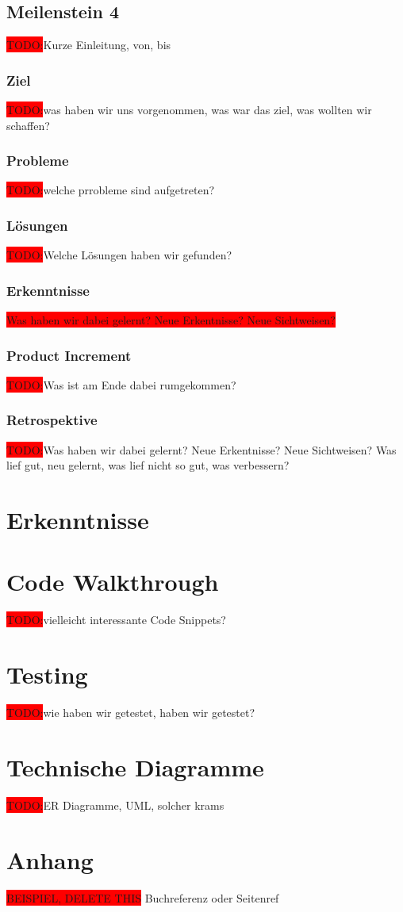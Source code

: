 \documentclass[10pt, a4paper, draft]{article}
\begin{document}
\subsection{Meilenstein 4}
\colorbox{red}{TODO:}Kurze Einleitung, von, bis
\subsubsection{Ziel}
\colorbox{red}{TODO:}was haben wir uns vorgenommen, was war das ziel, was wollten wir schaffen?
\subsubsection{Probleme}
\colorbox{red}{TODO:}welche prrobleme sind aufgetreten?

\subsubsection{Lösungen}
\colorbox{red}{TODO:}Welche Lösungen haben wir gefunden?

\subsubsection{Erkenntnisse}
\colorbox{red}{Was haben wir dabei gelernt? Neue Erkentnisse? Neue Sichtweisen?}

\subsubsection{Product Increment}
\colorbox{red}{TODO:}Was ist am Ende dabei rumgekommen?

\subsubsection{Retrospektive}
\colorbox{red}{TODO:}Was haben wir dabei gelernt? Neue Erkentnisse? Neue Sichtweisen?
Was lief gut, neu gelernt, was lief nicht so gut, was verbessern?

\section{Erkenntnisse}

\section{Code Walkthrough}
\colorbox{red}{TODO:}vielleicht interessante Code Snippets?

\section{Testing}
\colorbox{red}{TODO:}wie haben wir getestet, haben wir getestet?

\section{Technische Diagramme}
\colorbox{red}{TODO:}ER Diagramme, UML, solcher krams

\newpage
\section{Anhang}
\colorbox{red}{BEISPIEL, DELETE THIS} Buchreferenz \cite{Literaturbeispiel:tom} oder Seitenref \cite{google}
\printbibliography
\end{document}
